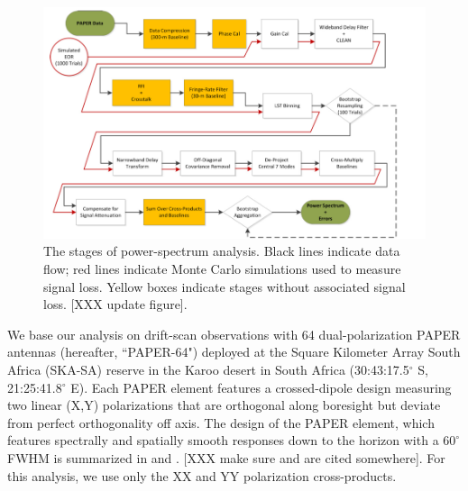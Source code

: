 \documentclass[twocolumn,numberedappendix]{emulateapj} \shorttitle{PSA64}
\begin{document}
\begin{figure}[!t]
\includegraphics[width=2\columnwidth,height=\columnwidth]{plots/data_flow_chart.png}
\caption
{
The stages of power-spectrum analysis. Black lines indicate data flow; red lines indicate
Monte Carlo simulations used to 
measure signal loss. Yellow boxes indicate stages without associated signal loss.
[XXX update figure].
}
\label{fig:flowchart}
\end{figure}

We base our analysis on drift-scan observations 
with 64 dual-polarization PAPER antennas (hereafter, ``PAPER-64") deployed 
at the Square Kilometer Array South Africa
(SKA-SA) reserve in the Karoo desert in South Africa
(30:43:17.5$^\circ$ S, 21:25:41.8$^\circ$ E).
Each PAPER element features a crossed-dipole design measuring two
linear (X,Y) polarizations that are orthogonal along boresight but deviate
from perfect orthogonality off axis.  The design of the PAPER element, 
which features spectrally and spatially smooth responses 
down to the horizon with a $60^{\circ}$ FWHM is summarized in \citet{parsons_et_al2010}
and \citet{pober_et_al2012}.  
[XXX make sure \cite{jacobs_et_al2011} and \cite{stefan_et_al2013} are cited somewhere].
For this analysis, we use only the XX and YY polarization cross-products.
\end{document}
